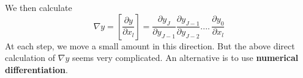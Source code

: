 \documentclass[12pt]{article}
\begin{document}
We then calculate
\begin{equation}
\nabla y = \left[ \frac{\partial y}{\partial x_l} \right] =
\frac{\partial y_J}{\partial y_{J-1}}
\frac{\partial y_{J-1}}{\partial y_{J-2}} .... \,
\frac{\partial y_0}{\partial x_l}
\end{equation}
At each step, we move a small amount in this direction.  But the above direct calculation of $\nabla y$ seems very complicated.  An alternative is to use \textbf{numerical differentiation}.

\end{document}
